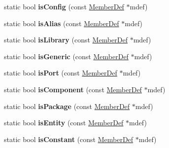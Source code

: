 \begin{DoxyCompactItemize}
\item 
\hypertarget{class_vhdl_doc_gen_affbb87d83fbe69d680cd21b06fd892be}{static bool {\bfseries is\-Config} (const \hyperlink{class_member_def}{Member\-Def} $\ast$mdef)}\label{class_vhdl_doc_gen_affbb87d83fbe69d680cd21b06fd892be}

\item 
\hypertarget{class_vhdl_doc_gen_a8483aa148019da7e33655b3249003a95}{static bool {\bfseries is\-Alias} (const \hyperlink{class_member_def}{Member\-Def} $\ast$mdef)}\label{class_vhdl_doc_gen_a8483aa148019da7e33655b3249003a95}

\item 
\hypertarget{class_vhdl_doc_gen_acff7204891ca1294b72e72081b6c0b21}{static bool {\bfseries is\-Library} (const \hyperlink{class_member_def}{Member\-Def} $\ast$mdef)}\label{class_vhdl_doc_gen_acff7204891ca1294b72e72081b6c0b21}

\item 
\hypertarget{class_vhdl_doc_gen_a73dd21d4d73923d263683ca97f9ffd3d}{static bool {\bfseries is\-Generic} (const \hyperlink{class_member_def}{Member\-Def} $\ast$mdef)}\label{class_vhdl_doc_gen_a73dd21d4d73923d263683ca97f9ffd3d}

\item 
\hypertarget{class_vhdl_doc_gen_a565f5b33c2f4cda0460425c35f73bfaf}{static bool {\bfseries is\-Port} (const \hyperlink{class_member_def}{Member\-Def} $\ast$mdef)}\label{class_vhdl_doc_gen_a565f5b33c2f4cda0460425c35f73bfaf}

\item 
\hypertarget{class_vhdl_doc_gen_acbae6bbaf978e3858df4c40686a685c5}{static bool {\bfseries is\-Component} (const \hyperlink{class_member_def}{Member\-Def} $\ast$mdef)}\label{class_vhdl_doc_gen_acbae6bbaf978e3858df4c40686a685c5}

\item 
\hypertarget{class_vhdl_doc_gen_a822a913fa43bd4f0ec1b3f01a8bc6aac}{static bool {\bfseries is\-Package} (const \hyperlink{class_member_def}{Member\-Def} $\ast$mdef)}\label{class_vhdl_doc_gen_a822a913fa43bd4f0ec1b3f01a8bc6aac}

\item 
\hypertarget{class_vhdl_doc_gen_a9da5990a9fc64faa386188884060125c}{static bool {\bfseries is\-Entity} (const \hyperlink{class_member_def}{Member\-Def} $\ast$mdef)}\label{class_vhdl_doc_gen_a9da5990a9fc64faa386188884060125c}

\item 
\hypertarget{class_vhdl_doc_gen_a67f3b05d93040f929512aa0d7ff1211b}{static bool {\bfseries is\-Constant} (const \hyperlink{class_member_def}{Member\-Def} $\ast$mdef)}\label{class_vhdl_doc_gen_a67f3b05d93040f929512aa0d7ff1211b}


\end{DoxyCompactItemize}
